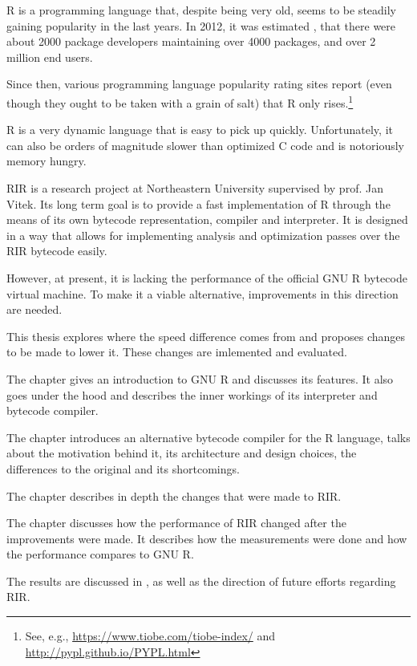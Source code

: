 R is a programming language that, despite being very old, seems to be steadily gaining popularity in the last years. In 2012, it was estimated \autocite{design}, that there were about 2000 package developers maintaining over 4000 packages, and over 2 million end users.

Since then, various programming language popularity rating sites report (even though they ought to be taken with a grain of salt) that R only rises.\footnote{See, e.g., \url{https://www.tiobe.com/tiobe-index/} and \url{http://pypl.github.io/PYPL.html}}

R is a very dynamic language that is easy to pick up quickly. Unfortunately, it can also be orders of magnitude slower than optimized C code and is notoriously memory hungry.

RIR is a research project at Northeastern University supervised by prof. Jan Vitek. Its long term goal is to provide a fast implementation of R through the means of its own bytecode representation, compiler and interpreter. It is designed in a way that allows for implementing analysis and optimization passes over the RIR bytecode easily.

However, at present, it is lacking the performance of the official GNU R bytecode virtual machine. To make it a viable alternative, improvements in this direction are needed.

This thesis explores where the speed difference comes from and proposes changes to be made to lower it. These changes are imlemented and evaluated.

The chapter \emph{} gives an introduction to GNU R and discusses its features. It also goes under the hood and describes the inner workings of its interpreter and bytecode compiler.


The chapter \emph{} introduces an alternative bytecode compiler for the R language, talks about the motivation behind it, its architecture and design choices, the differences to the original and its shortcomings.

The chapter \emph{} describes in depth the changes that were made to RIR.

The chapter \emph{} discusses how the performance of RIR changed after the improvements were made. It describes how the measurements were done and how the performance compares to GNU R.

The results are discussed in \emph{}, as well as the direction of future efforts regarding RIR.
